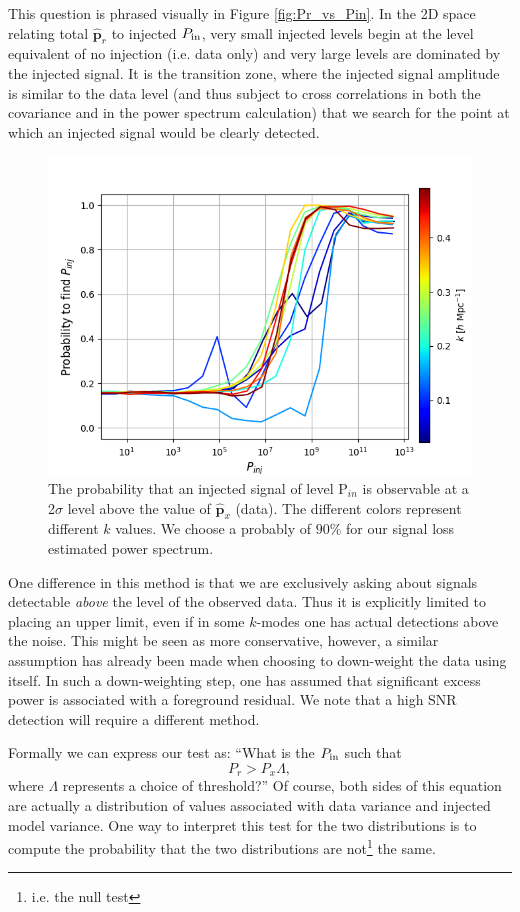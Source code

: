 \documentclass[preprint2,numberedappendix,tighten]{aastex6}  %
\begin{document}
This question is phrased visually in Figure \ref{fig:Pr_vs_Pin}. In the 2D space relating total $\hat{\textbf{p}}_r$ to injected $P_{\rm in}$, very small injected levels begin at the level equivalent of no injection (i.e. data only) and very large levels are dominated by the injected signal. It is the transition zone, where the injected signal amplitude is similar to the data level (and thus subject to cross correlations in both the covariance and in the power spectrum calculation) that we search for the point at which an injected signal would be clearly detected.
  
\begin{figure}[tp]
\centering
\includegraphics[width=.5\textwidth]{plots/method2_prob_vs_pinj.png}
\caption{The probability that an injected signal of level P$_{in}$
is observable at a 2$\sigma$ level above the value of $\hat{\textbf{p}}_{x}$ (data).
The different colors represent different $k$ values. We choose a probably of $90\%$ for our signal loss estimated power spectrum.
\label{fig:Prob_vs_Pin}}
\end{figure}  
  
One difference in this method is that we are exclusively asking about signals detectable \emph{above} the level of the observed data. Thus it is explicitly limited to placing an upper limit, even if in some $k$-modes one has actual detections above the noise.  This might be seen as more conservative, however, a similar assumption has already been made when choosing to down-weight the data using itself. In such a down-weighting step, one has assumed that significant excess power is associated with a foreground residual. We note that a high SNR detection will require a different method.
  
Formally we can express our test as: ``What is the $P_{\rm in}$ such that
\begin{equation}
P_{r} > P_{x} \Lambda,
\end{equation}  
where $\Lambda$ represents a choice of threshold?'' Of course, both sides of this equation are actually a distribution of values associated with data variance and injected model variance. One way to interpret this test for the two distributions is to compute the probability that the two distributions are not\footnote{i.e. the null test} the same.  
 
\end{document}
